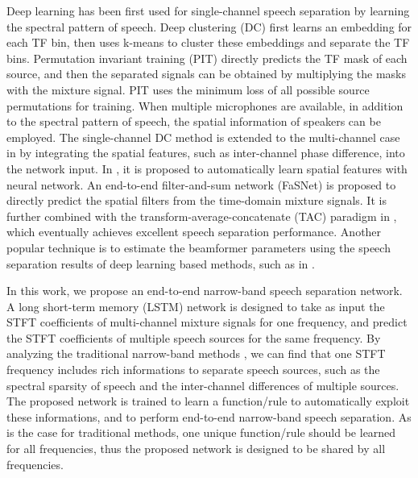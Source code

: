 \documentclass{article}
\begin{document}
Deep learning has been first used for single-channel speech separation by learning the spectral pattern of speech.
Deep clustering (DC) \cite{hershey_deep_2016} first learns an embedding for each TF bin, then uses k-means to cluster these embeddings and separate the TF bins.
Permutation invariant training (PIT) \cite{yu_permutation_2017} directly predicts the TF mask of each source, and then the separated signals can be obtained by multiplying the masks with the mixture signal.
PIT uses the minimum loss of all possible source permutations for training.
When multiple microphones are available, in addition to the spectral pattern of speech, the spatial information of speakers can be employed.
The single-channel DC method is extended to the multi-channel case in \cite{wang_multi-channel_2018} by integrating the spatial features, such as inter-channel phase difference, into the network input.
In \cite{gu_enhancing_2020}, it is proposed to automatically learn spatial features with neural network.
An end-to-end filter-and-sum network (FaSNet) \cite{luo_fasnet_2019} is proposed to directly predict the spatial filters from the time-domain mixture signals.
It is further combined with the transform-average-concatenate (TAC) paradigm in \cite{luo_end--end_2020}, which eventually achieves excellent speech separation performance.
Another popular technique is to estimate the beamformer parameters using the speech separation results of deep learning based methods, such as in \cite{ochiai_beam-tasnet_2020, heymann_blstm_2015}.

In this work, we propose an end-to-end narrow-band speech separation network.
A long short-term memory (LSTM) network is designed to take as input the STFT coefficients of multi-channel mixture signals for one frequency, and predict the STFT coefficients of multiple speech sources for the same frequency.
By analyzing the traditional narrow-band methods \cite{winter_map-based_2006, gannot_consolidated_2017, boeddecker_front-end_2018}, we can find that one STFT frequency includes rich informations to separate speech sources, such as the spectral sparsity of speech and the inter-channel differences of multiple sources.
The proposed network is trained to learn a function/rule to automatically exploit these informations, and to perform end-to-end narrow-band speech separation.
As is the case for traditional methods, one unique function/rule should be learned for all frequencies, thus the proposed network is designed to be shared by all frequencies. 
\end{document}
